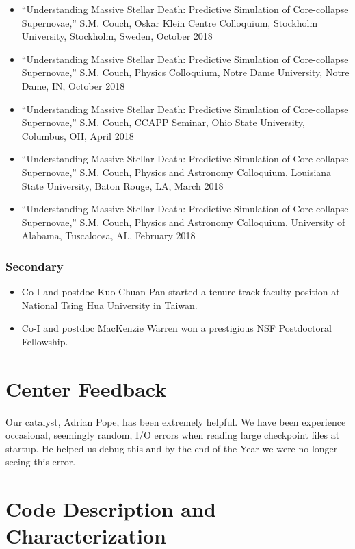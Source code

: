 \documentclass[12pt,titlepage]{article}
\begin{document}

\begin{itemize}
  \item ``Understanding Massive Stellar Death: Predictive Simulation of Core-collapse Supernovae,'' S.M. Couch, Oskar Klein Centre Colloquium, Stockholm University, Stockholm, Sweden, October 2018
  \item ``Understanding Massive Stellar Death: Predictive Simulation of Core-collapse Supernovae,'' S.M. Couch, Physics Colloquium, Notre Dame University, Notre Dame, IN, October 2018
  \item ``Understanding Massive Stellar Death: Predictive Simulation of Core-collapse Supernovae,'' S.M. Couch, CCAPP Seminar, Ohio State University, Columbus, OH, April 2018
  \item ``Understanding Massive Stellar Death: Predictive Simulation of Core-collapse Supernovae,'' S.M. Couch, Physics and Astronomy Colloquium, Louisiana State University, Baton Rouge, LA, March 2018
  \item ``Understanding Massive Stellar Death: Predictive Simulation of Core-collapse Supernovae,'' S.M. Couch, Physics and Astronomy Colloquium, University of Alabama, Tuscaloosa, AL, February 2018
\end{itemize}

\subsubsection{Secondary}

\begin{itemize}
  \item Co-I and postdoc Kuo-Chuan Pan started a tenure-track faculty position at National Tsing Hua University in Taiwan.
  \item Co-I and postdoc MacKenzie Warren won a prestigious NSF Postdoctoral Fellowship.
\end{itemize}

\section{Center Feedback}

Our catalyst, Adrian Pope, has been extremely helpful.
We have been experience occasional, seemingly random, I/O errors when reading large checkpoint files at startup.
He helped us debug this and by the end of the Year we were no longer seeing this error.


\section{Code Description and Characterization}
\end{document}
